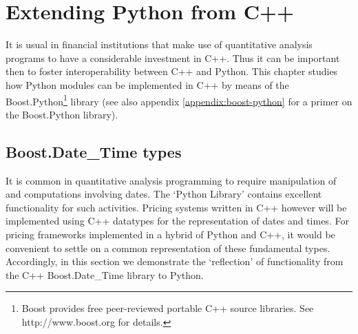 \chapter{Extending Python from C++}\label{ch:extending-python-from-c++}

It is usual in financial institutions that make use of quantitative
analysis programs to have a considerable investment in C++.  Thus it
can be important then to foster interoperability between C++ and
Python. This chapter studies how Python modules can be implemented in
C++ by means of the Boost.Python\footnote{Boost provides free
peer-reviewed portable C++ source libraries. See http://www.boost.org
for details.}  library (see also appendix \ref{appendix:boost-python}
for a primer on the Boost.Python library).

\section{Boost.Date\_Time types} \label{sec:boost-date-time}

It is common in quantitative analysis programming to require
manipulation of and computations involving dates.  The `Python
Library' contains excellent functionality for such activities.
Pricing systems written in C++ however will be implemented using C++
datatypes for the representation of dates and times. For pricing
frameworks implemented in a hybrid of Python and C++, it would be
convenient to settle on a common representation of these fundamental
types. Accordingly, in this section we demonstrate the `reflection' of
functionality from the C++ Boost.Date\_Time library to Python.

